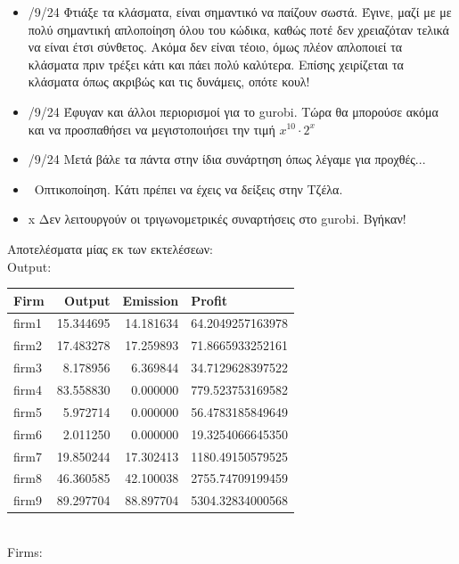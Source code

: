 \documentclass[a4paper,twoside,10pt]{article}
\begin{document}
\begin{itemize}[label={}]
\begin{itemize}[label ={}]
		\item {}/9/24 \rbrack Φτιάξε τα κλάσματα, είναι σημαντικό να παίζουν σωστά. Έγινε, μαζί με με πολύ σημαντική απλοποίηση όλου του κώδικα, καθώς ποτέ δεν χρειαζόταν τελικά να είναι έτσι σύνθετος. Ακόμα δεν είναι τέοιο, όμως πλέον απλοποιεί τα κλάσματα πριν τρέξει κάτι και πάει πολύ καλύτερα. Επίσης χειρίζεται τα κλάσματα όπως ακριβώς και τις δυνάμεις, οπότε κουλ!
		\item {}/9/24 \rbrack Έφυγαν και άλλοι περιορισμοί για το gurobi. Τώρα θα μπορούσε ακόμα και να προσπαθήσει να μεγιστοποιήσει την τιμή $x^{10} \cdot 2^x$
		\item {}/9/24 \rbrack Μετά βάλε τα πάντα στην ίδια συνάρτηση όπως λέγαμε για προχθές...
		\item \lbrack \ \rbrack Οπτικοποίηση. Κάτι πρέπει να έχεις να δείξεις στην Τζέλα.
		\item \lbrack x \rbrack Δεν λειτουργούν οι τριγωνομετρικές συναρτήσεις στο gurobi. Βγήκαν!
	\end{itemize}
	\end{itemize}
	Αποτελέσματα μίας εκ των εκτελέσεων:\\
	Output:
\begin{tabular}{lrrl}
	\toprule
	Firm & Output & Emission & Profit \\
	\midrule
	firm1 & 15.344695 & 14.181634 & 64.2049257163978 \\
	firm2 & 17.483278 & 17.259893 & 71.8665933252161 \\
	firm3 & 8.178956 & 6.369844 & 34.7129628397522 \\
	firm4 & 83.558830 & 0.000000 & 779.523753169582 \\
	firm5 & 5.972714 & 0.000000 & 56.4783185849649 \\
	firm6 & 2.011250 & 0.000000 & 19.3254066645350 \\
	firm7 & 19.850244 & 17.302413 & 1180.49150579525 \\
	firm8 & 46.360585 & 42.100038 & 2755.74709199459 \\
	firm9 & 89.297704 & 88.897704 & 5304.32834000568 \\
	\bottomrule
\end{tabular}\\
Firms:
\end{document}
